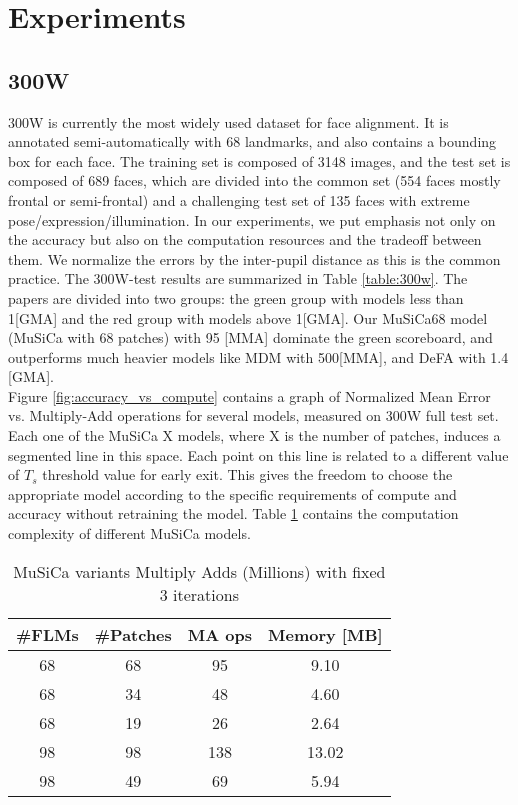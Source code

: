 \documentclass[9pt,twocolumn]{extarticle}
\begin{document}
\section{Experiments}
\subsection{300W}


300W \cite{sagonas2013300} is currently the most widely used dataset for face alignment. It is annotated semi-automatically with 68 landmarks, and also contains a bounding box for each face. The training set is composed of 3148 images, and the test set is composed of 689 faces, which are divided into the common set (554 faces mostly frontal or semi-frontal) and a challenging test set of 135 faces with extreme pose/expression/illumination. In our experiments, we put emphasis not only on the accuracy but also on the computation resources and the tradeoff between them. We normalize the errors by the inter-pupil distance as this is the common practice. The 300W-test results are summarized in Table \ref{table:300w}. The papers are divided into two groups: the green group with models less than 1[GMA] and the red group with models above 1[GMA]. Our MuSiCa68 model (MuSiCa with 68 patches) with 95 [MMA] dominate the green scoreboard, and outperforms much heavier models like MDM \cite{trigeorgis2016mnemonic} with 500[MMA], and DeFA \cite{liu2017dense} with 1.4 [GMA]. \\
Figure \ref{fig:accuracy_vs_compute} contains a graph of Normalized Mean Error vs. Multiply-Add operations for several models, measured on 300W full test set. Each one of the MuSiCa X models, where X is the number of patches, induces a segmented line in this space. Each point on this line is related to a different value of $T_{s}$ threshold value for early exit. This gives the freedom to choose the appropriate model according to the specific requirements of compute and accuracy without retraining the model. Table \ref{table:musica_complexity} contains the computation complexity of different MuSiCa models.

\begin{table}[]
\centering
\small
\begin{tabular}{@{}cccc@{}}

\toprule
\#FLMs & \#Patches & MA ops & Memory [MB]\\ \midrule
68     & 68        & 95     & 9.10\\
68     & 34        & 48     & 4.60\\
68     & 19        & 26     & 2.64\\
98     & 98        & 138    & 13.02\\
98     & 49        & 69     & 5.94\\ \bottomrule
\end{tabular}
\caption{MuSiCa variants Multiply Adds (Millions) with fixed 3 iterations}
\label{table:musica_complexity}
\end{table}
\end{document}
